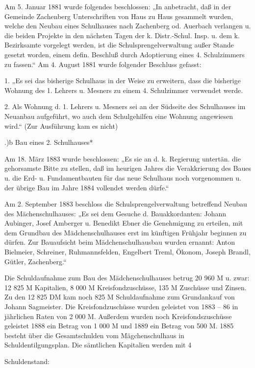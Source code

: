\documentclass{book}
\begin{document}
Am 5. Januar 1881 wurde folgendes beschlossen: „In anbetracht, daß in der
Gemeinde Zachenberg Unterschriften von Haus zu Haus gesammelt wurden, welche den
Neubau eines Schulhauses nach Zachenberg od. Auerbach verlangen u. die beiden
Projekte in den nächsten Tagen der k. Distr.-Schul. Insp. u. dem k. Bezirksamte
vorgelegt werden, ist die Schulsprengelverwaltung außer Stande gesetzt worden,
einem defin. Beschluß durch Adoptierung eines 4. Schulzimmers zu fassen.“ Am 4.
August 1881 wurde folgender Beschluss gefasst:



1. „Es sei das bisherige Schulhaus in der Weise zu erweitern, dass die bisherige
Wohnung des 1. Lehrers u. Mesners zu einem 4. Schulzimmer verwendet werde.

2. Als Wohnung d. 1. Lehrers u. Mesners sei an der Südseite des Schulhauses im
Neuanbau aufgeführt, wo auch dem Schulgehilfen eine Wohnung angewiesen wird.“
(Zur Ausführung kam es nicht)

.)b Bau eines 2. Schulhauses*

Am 18. März 1883 wurde beschlossen: „Es sie an d. k. Regierung untertän. die
gehorsamste Bitte zu stellen, daß im heurigen Jahres die Verakkrierung des Baues
u. die Erd- u. Fundamentbauten für das neue Schulhaus noch vorgenommen u. der
übrige Bau im Jahre 1884 vollendet werden dürfe.“

Am 2. September 1883 beschloss die Schulsprengelverwaltung betreffend Neubau des
Mächenschulhauses: „Es sei dem Gesuche d. Bauakkordanten: Johann Aubinger, Josef
Amberger u. Benedikt Ebner die Genehmigung zu erteilen, mit dem Grundbau des
Mädchenschulhauses erst im künftigen Frühjahr beginnen zu dürfen. Zur
Bauaufsicht beim Mädchenschulhausbau wurden ernannt: Anton Bielmeier, Schreiner,
Ruhmannsfelden, Engelbert Treml, Ökonom, Joseph Brandl, Gütler, Zachenberg.“

Die Schuldaufnahme zum Bau des Mädchenschulhauses betrug 20 960 M u. zwar: 12
825 M Kapitalien, 8 000 M Kreisfondzuschüsse, 135 M Zuschüsse und Zinsen. Zu den
12 825 DM kam noch 825 M Schuldaufnahme zum Grundankauf von Johann Sagmeister.
Die Kreisfondzuschüsse wurden geleistet von 1883 – 86 in jährlichen Raten von 2
000 M. Außerdem wurden noch Kreisfondszuschüsse geleistet 1888 ein Betrag von 1
000 M und 1889 ein Betrag von 500 M. 1885 besteht über die Gesamtschulden vom
Mägchenschulhaus in Schuldentilgungsplan. Die sämtlichen Kapitalien werden mit 4



Schuldenstand:
\end{document}
